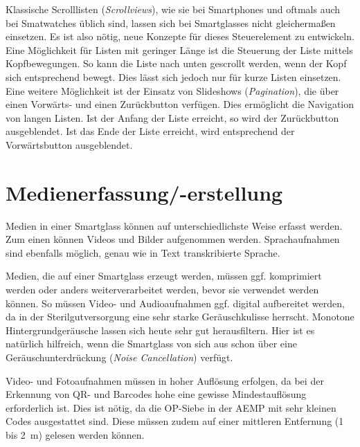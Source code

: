 Klassische Scrolllisten (\emph{Scrollviews}), wie sie bei Smartphones und oftmals auch bei Smatwatches üblich sind, lassen sich bei Smartglasses nicht gleichermaßen einsetzen. Es ist also nötig, neue Konzepte für dieses Steuerelement zu entwickeln. Eine Möglichkeit für Listen mit geringer Länge ist die Steuerung der Liste mittels Kopfbewegungen. So kann die Liste nach unten gescrollt werden, wenn der Kopf sich entsprechend bewegt. Dies lässt sich jedoch nur für kurze Listen einsetzen. Eine weitere Möglichkeit ist der Einsatz von Slideshows (\emph{Pagination}), die über einen Vorwärts- und einen Zurückbutton verfügen. Dies ermöglicht die Navigation von langen Listen. Ist der Anfang der Liste erreicht, so wird der Zurückbutton ausgeblendet. Ist das Ende der Liste erreicht, wird entsprechend der Vorwärtsbutton ausgeblendet.
%
%
%
%
%
%
\section{Medienerfassung/-erstellung}
\label{sec:Medienerfassung_-erstellung}
Medien in einer Smartglass können auf unterschiedlichste Weise erfasst werden. Zum einen können Videos und Bilder aufgenommen werden. Sprachaufnahmen sind ebenfalls möglich, genau wie in Text transkribierte Sprache.

Medien, die auf einer Smartglass erzeugt werden, müssen ggf. komprimiert werden oder anders weiterverarbeitet werden, bevor sie verwendet werden können. So müssen Video- und Audioaufnahmen ggf. digital aufbereitet werden, da in der Sterilgutversorgung eine sehr starke Geräuschkulisse herrscht. Monotone Hintergrundgeräusche lassen sich heute sehr gut herausfiltern. Hier ist es natürlich hilfreich, wenn die Smartglass von sich aus schon über eine Geräuschunterdrückung (\emph{Noise Cancellation}) verfügt.

Video- und Fotoaufnahmen müssen in hoher Auflösung erfolgen, da bei der Erkennung von QR- und Barcodes hohe eine gewisse Mindestauflösung erforderlich ist. Dies ist nötig, da die OP-Siebe in der AEMP mit sehr kleinen Codes ausgestattet sind. Diese müssen zudem auf einer mittleren Entfernung (1 bis 2~m) gelesen werden können.
%
